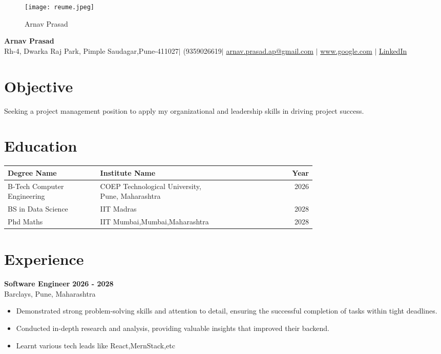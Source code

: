 \documentclass[a4paper,10pt]{article}
\makeatletter
\newcommand{\myname}{Arnav Prasad}
\newcommand{\myaddress}{Rh-4, Dwarka Raj Park, Pimple Saudagar,Pune-411027}
\newcommand{\myphone}{(9359026619}
\newcommand{\myemail}{arnav.prasad.ap@gmail.com}
\newcommand{\mywebsite}{www.google.com}
\newcommand{\linkedin}{https://www.linkedin.com/in/arnav-prasad-82264b296}
\makeatother
\begin{document}
\pagestyle{empty}

\begin{figure}[h]
\centering
\texttt{[image: reume.jpeg]}
\caption{Arnav Prasad}
\label{fig:example}
\end{figure}



\begin{center}
    {\Huge \bfseries \myname}\\
    \vspace{5pt}
    \myaddress $|$ \myphone $|$ \href{mailto:\myemail}{\myemail} $|$ \href{\mywebsite}{\mywebsite} $|$ \href{\linkedin}{LinkedIn}
\end{center}

\section*{Objective}
Seeking a project management position to apply my organizational and leadership skills in driving project success.

\section*{Education}

\begin{tabular}{|p{0.3\linewidth}|p{0.4\linewidth}|r|}
\hline
\textbf{Degree Name} & \textbf{Institute Name} & \textbf{Year} \\
\hline
B-Tech Computer Engineering & COEP Technological University, Pune, Maharashtra & 2026 \\
\hline
BS in Data Science & IIT Madras & 2028 \\
\hline
Phd Maths & IIT Mumbai,Mumbai,Maharashtra & 2028 \\
\hline
\end{tabular}




\section*{Experience}
\textbf{Software Engineer} \hfill \textbf{2026 - 2028}\\
Barclays, Pune, Maharashtra\\
\begin{itemize}
    \item Demonstrated strong problem-solving skills and attention to detail, ensuring the successful completion of tasks within tight deadlines.
    \item Conducted in-depth research and analysis, providing valuable insights that improved their backend.
    \item Learnt various tech leads like React,MernStack,etc
\end{itemize}
\end{document}
